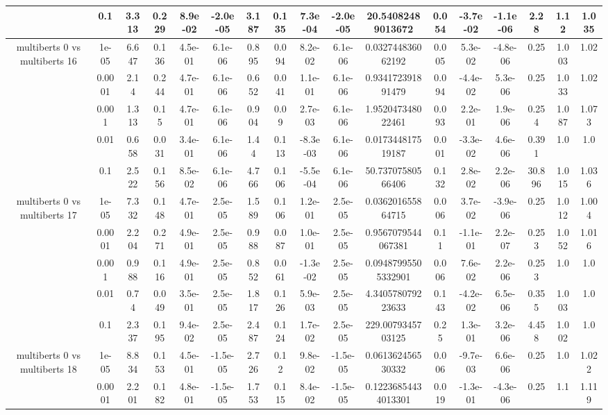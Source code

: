 \begin{tabular}{|c|c|c|c|c|c|c|c|c|c|c|c|c|c|c|c|c|}
 & 0.1 & 3.313 & 0.229 & 8.9e-02 & -2.0e-05 & 3.187 & 0.135 & 7.3e-04 & -2.0e-05 & 20.54082489013672 & 0.054 & -3.7e-02 & -1.1e-06 & 2.28 & 1.12 & 1.035 \\
\hline
\multirow{5}{*}{multiberts 0 vs multiberts 16} & 1e-05 & 6.647 & 0.136 & 4.5e-01 & 6.1e-06 & 0.895 & 0.094 & 8.2e-02 & 6.1e-06 & 0.032744836062192 & 0.005 & 5.3e-02 & -4.8e-06 & 0.25 & 1.003 & 1.02 \\
 & 0.0001 & 2.14 & 0.244 & 4.7e-01 & 6.1e-06 & 0.652 & 0.041 & 1.1e-01 & 6.1e-06 & 0.934172391891479 & 0.094 & -4.4e-02 & 5.3e-06 & 0.25 & 1.033 & 1.02 \\
 & 0.001 & 1.313 & 0.15 & 4.7e-01 & 6.1e-06 & 0.904 & 0.09 & 2.7e-03 & 6.1e-06 & 1.952047348022461 & 0.093 & 2.2e-01 & 1.9e-06 & 0.254 & 1.087 & 1.073 \\
 & 0.01 & 0.658 & 0.031 & 3.4e-01 & 6.1e-06 & 1.44 & 0.113 & -8.3e-03 & 6.1e-06 & 0.017344817519187 & 0.001 & -3.3e-02 & 4.6e-06 & 0.391 & 1.0 & 1.0 \\
 & 0.1 & 2.522 & 0.156 & 8.5e-02 & 6.1e-06 & 4.766 & 0.106 & -5.5e-04 & 6.1e-06 & 50.73707580566406 & 0.132 & 2.8e-02 & 2.2e-06 & 30.896 & 1.015 & 1.036 \\
\hline
\multirow{5}{*}{multiberts 0 vs multiberts 17} & 1e-05 & 7.332 & 0.148 & 4.7e-01 & 2.5e-05 & 1.589 & 0.106 & 1.2e-01 & 2.5e-05 & 0.036201655864715 & 0.006 & 3.7e-02 & -3.9e-06 & 0.25 & 1.012 & 1.004 \\
 & 0.0001 & 2.204 & 0.271 & 4.9e-01 & 2.5e-05 & 0.988 & 0.087 & 1.0e-01 & 2.5e-05 & 0.9567079544067381 & 0.11 & -1.1e-01 & 2.2e-07 & 0.253 & 1.052 & 1.016 \\
 & 0.001 & 0.988 & 0.116 & 4.9e-01 & 2.5e-05 & 0.852 & 0.061 & -1.3e-02 & 2.5e-05 & 0.09487995505332901 & 0.006 & 7.6e-02 & 2.2e-06 & 0.253 & 1.0 & 1.0 \\
 & 0.01 & 0.74 & 0.049 & 3.5e-01 & 2.5e-05 & 1.817 & 0.126 & 5.9e-03 & 2.5e-05 & 4.340578079223633 & 0.143 & -4.2e-02 & 6.5e-06 & 0.355 & 1.003 & 1.0 \\
 & 0.1 & 2.337 & 0.195 & 9.4e-02 & 2.5e-05 & 2.487 & 0.124 & 1.7e-02 & 2.5e-05 & 229.0079345703125 & 0.25 & 1.3e-01 & 3.2e-06 & 4.458 & 1.002 & 1.0 \\
\hline
\multirow{5}{*}{multiberts 0 vs multiberts 18} & 1e-05 & 8.834 & 0.153 & 4.5e-01 & -1.5e-05 & 2.726 & 0.12 & 9.8e-02 & -1.5e-05 & 0.061362456530332 & 0.006 & -9.7e-03 & 6.6e-06 & 0.25 & 1.0 & 1.022 \\
 & 0.0001 & 2.201 & 0.182 & 4.8e-01 & -1.5e-05 & 1.753 & 0.115 & 8.4e-02 & -1.5e-05 & 0.12236854434013301 & 0.019 & -1.3e-01 & -4.3e-06 & 0.25 & 1.1 & 1.119 \\

\end{tabular}
